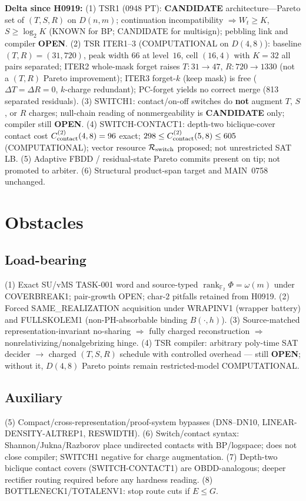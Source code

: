 \documentclass[11pt]{article}
\begin{document}
\textbf{Delta since H0919:}
(1) TSR1 (0948 PT): \textbf{CANDIDATE} architecture---Pareto set of $(T,S,R)$ on $D(n,m)$;
continuation incompatibility $\Rightarrow W_t\ge K$, $S\ge\log_2 K$ (KNOWN for BP; CANDIDATE for multisign);
pebbling link and compiler \textbf{OPEN}.
(2) TSR ITER1--3 (COMPUTATIONAL on $D(4,8)$): baseline $(T,R)=(31,720)$, peak width $66$ at level~$16$,
cell $(16,4)$ with $K=32$ all pairs separated; ITER2 whole-mask forget raises $T:31\to47$, $R:720\to1330$
(not a $(T,R)$ Pareto improvement); ITER3 forget-$k$ (keep mask) is free ($\Delta T=\Delta R=0$, $k$-charge redundant);
PC-forget yields no correct merge (813 separated residuals).
(3) SWITCH1: contact/on-off switches do \textbf{not} augment $T$, $S$, or $R$ charges;
null-chain reading of nonmergeability is \textbf{CANDIDATE} only; compiler still \textbf{OPEN}.
(4) SWITCH-CONTACT1: depth-two biclique-cover contact cost $C^{(2)}_{\rm contact}(4,8)=96$ exact;
$298\le C^{(2)}_{\rm contact}(5,8)\le605$ (COMPUTATIONAL); vector resource $\mathcal R_{\rm switch}$ proposed;
not unrestricted SAT LB.
(5) Adaptive FBDD / residual-state Pareto commits present on tip; not promoted to arbiter.
(6) Structural product-span target and MAIN~0758 unchanged.

\section*{Obstacles}
\subsection*{Load-bearing}
(1) Exact SU/vMS TASK-001 word and source-typed
$\operatorname{rank}_{\mathbb F_2}\Phi=\omega(m)$ under COVERBREAK1; pair-growth OPEN;
char-$2$ pitfalls retained from H0919.
(2) Forced SAME\_REALIZATION acquisition under WRAPINV1 (wrapper battery) and FULLSKOLEM1
(non-PH-absorbable binding $B(\cdot,h)$).
(3) Source-matched representation-invariant no-sharing $\Rightarrow$ fully charged reconstruction
$\Rightarrow$ nonrelativizing/nonalgebrizing hinge.
(4) TSR compiler: arbitrary poly-time SAT decider $\to$ charged $(T,S,R)$ schedule with controlled overhead
--- still \textbf{OPEN}; without it, $D(4,8)$ Pareto points remain restricted-model COMPUTATIONAL.

\subsection*{Auxiliary}
(5) Compact/cross-representation/proof-system bypasses (DN8--DN10, LINEAR-DENSITY-ALTREP1, RESWIDTH).
(6) Switch/contact syntax: Shannon/Jukna/Razborov place undirected contacts with BP/logspace;
does not close compiler; SWITCH1 negative for charge augmentation.
(7) Depth-two biclique contact covers (SWITCH-CONTACT1) are OBDD-analogous; deeper rectifier routing required before any hardness reading.
(8) BOTTLENECK1/TOTALENV1: stop route cuts if $E\le G$.
\end{document}
